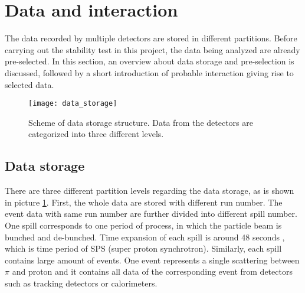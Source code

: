 

\section{Data and interaction}
The data recorded by multiple detectors are stored in different partitions. Before carrying out the stability test in this project, the data being analyzed are already pre-selected. In this section, an overview about data storage and pre-selection is discussed, followed by a short introduction of probable interaction giving rise to selected data.

\begin{figure}[t!]
	\centering
	\texttt{[image: data\_storage]}
	\caption{Scheme of data storage structure. Data from the detectors are categorized into three different levels.}
	\label{fig:data_storage}
\end{figure}

\subsection{Data storage}
There are three different partition levels regarding the data storage, as is shown in picture \ref{fig:data_storage}. First, the whole data are stored with different run number. The event data with same run number are further divided into different spill number. One spill corresponds to one period of process, in which the particle beam is bunched and de-bunched. Time expansion of each spill is around 48 seconds \cite{COMPASS}, which is time period of SPS (super proton synchrotron). Similarly, each spill contains large amount of events. One event represents a single scattering between $\pi$ and proton and it contains all data of the corresponding event from detectors such as tracking detectors or calorimeters.

